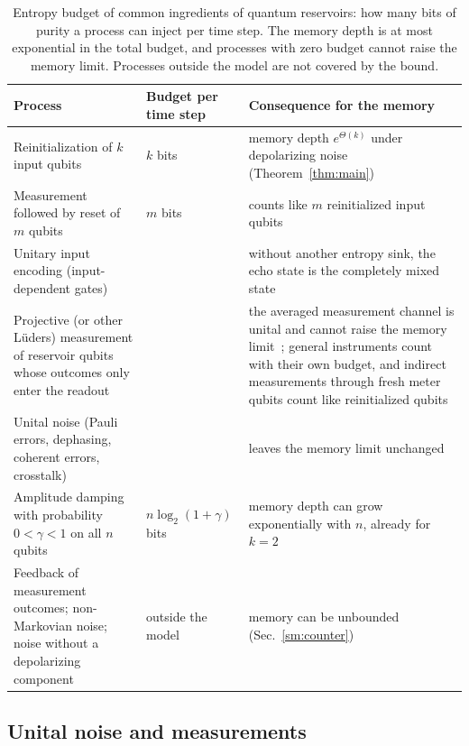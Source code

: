 \documentclass[aps,prl,twocolumn,superscriptaddress,floatfix]{revtex4-2}
\theoremstyle{plain}
\begin{document}
\begin{table}[t]
\caption{Entropy budget of common ingredients of quantum reservoirs: how many bits of purity a process can inject per time step. The memory depth is at most exponential in the total budget, and processes with zero budget cannot raise the memory limit. Processes outside the model are not covered by the bound.}
\label{tabS:budget}
\begin{ruledtabular}
\begin{tabular}{>{\raggedright\arraybackslash}p{5.3cm}>{\raggedright\arraybackslash}p{2.7cm}>{\raggedright\arraybackslash}p{8.3cm}}
Process & Budget per time step & Consequence for the memory \\ \hline
Reinitialization of $k$ input qubits & $k$ bits & memory depth $e^{\Theta(k)}$ under depolarizing noise (Theorem~\ref{thm:main}) \\
Measurement followed by reset of $m$ qubits & $m$ bits & counts like $m$ reinitialized input qubits~\cite{Yasuda2023,Hu2024} \\
Unitary input encoding (input-dependent gates) & 0 & without another entropy sink, the echo state is the completely mixed state \\
Projective (or other L\"uders) measurement of reservoir qubits whose outcomes only enter the readout & 0 & the averaged measurement channel is unital and cannot raise the memory limit~\cite{Mujal2023}; general instruments count with their own budget, and indirect measurements through fresh meter qubits count like reinitialized qubits~\cite{MorguiSancho2026} \\
Unital noise (Pauli errors, dephasing, coherent errors, crosstalk) & 0 & leaves the memory limit unchanged \\
Amplitude damping with probability $0<\gamma<1$ on all $n$ qubits & $n\log_2(1+\gamma)$ bits & memory depth can grow exponentially with $n$, already for $k=2$~\cite{BenOr2013,Monzani2024,Freiheit2026} \\
Feedback of measurement outcomes; non-Markovian noise; noise without a depolarizing component & outside the model & memory can be unbounded (Sec.~\ref{sm:counter})~\cite{Sannia2026} \\
\end{tabular}
\end{ruledtabular}
\end{table}

\subsection{Unital noise and measurements}
\end{document}
